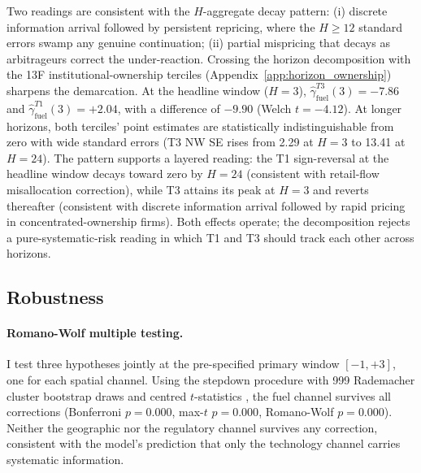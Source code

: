 \documentclass[12pt,a4paper]{article}
\begin{document}
Two readings are consistent with the $H$-aggregate decay pattern: (i) discrete information arrival followed by persistent repricing, where the $H \geq 12$ standard errors swamp any genuine continuation; (ii) partial mispricing that decays as arbitrageurs correct the under-reaction. Crossing the horizon decomposition with the 13F institutional-ownership terciles (Appendix~\ref{app:horizon_ownership}) sharpens the demarcation. At the headline window ($H = 3$), $\hat\gamma^{T3}_{\text{fuel}}(3) = -7.86$ and $\hat\gamma^{T1}_{\text{fuel}}(3) = +2.04$, with a difference of $-9.90$ (Welch $t = -4.12$). At longer horizons, both terciles' point estimates are statistically indistinguishable from zero with wide standard errors (T3 NW SE rises from 2.29 at $H = 3$ to 13.41 at $H = 24$). The pattern supports a layered reading: the T1 sign-reversal at the headline window decays toward zero by $H = 24$ (consistent with retail-flow misallocation correction), while T3 attains its peak at $H = 3$ and reverts thereafter (consistent with discrete information arrival followed by rapid pricing in concentrated-ownership firms). Both effects operate; the decomposition rejects a pure-systematic-risk reading in which T1 and T3 should track each other across horizons.

\subsection{Robustness}\label{sec:robustness}

\paragraph{Romano-Wolf multiple testing.}
I test three hypotheses jointly at the pre-specified primary window $[-1, +3]$, one for each spatial channel. Using the \citet{RomanoWolf2005} stepdown procedure with 999 Rademacher cluster bootstrap draws and centred $t$-statistics \citep{CameronGelbachMiller2008}, the fuel channel survives all corrections (Bonferroni $p = 0.000$, max-$t$ $p = 0.000$, Romano-Wolf $p = 0.000$). Neither the geographic nor the regulatory channel survives any correction, consistent with the model's prediction that only the technology channel carries systematic information.
\end{document}
